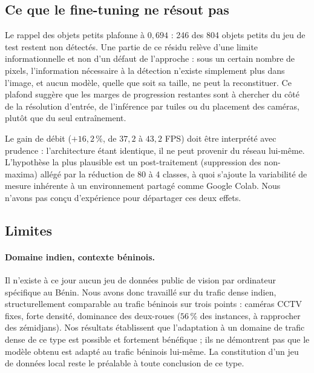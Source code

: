 \subsection{Ce que le fine-tuning ne résout pas}

Le rappel des objets petits plafonne à $0{,}694$ : 246 des 804 objets
petits du jeu de test restent non détectés. Une partie de ce résidu
relève d'une limite informationnelle et non d'un défaut de l'approche :
sous un certain nombre de pixels, l'information nécessaire à la détection
n'existe simplement plus dans l'image, et aucun modèle, quelle que soit
sa taille, ne peut la reconstituer. Ce plafond suggère que les marges de
progression restantes sont à chercher du côté de la résolution d'entrée,
de l'inférence par tuiles ou du placement des caméras, plutôt que du seul
entraînement.

Le gain de débit ($+16{,}2\,\%$, de $37{,}2$ à $43{,}2$ FPS) doit être
interprété avec prudence : l'architecture étant identique, il ne peut
provenir du réseau lui-même. L'hypothèse la plus plausible est un
post-traitement (suppression des non-maxima) allégé par la réduction de
80 à 4 classes, à quoi s'ajoute la variabilité de mesure inhérente à un
environnement partagé comme Google Colab. Nous n'avons pas conçu
d'expérience pour départager ces deux effets.

\subsection{Limites}

\paragraph{Domaine indien, contexte béninois.}
Il n'existe à ce jour aucun jeu de données public de vision par
ordinateur spécifique au Bénin. Nous avons donc travaillé sur du trafic
dense indien, structurellement comparable au trafic béninois sur trois
points : caméras CCTV fixes, forte densité, dominance des deux-roues
($56\,\%$ des instances, à rapprocher des zémidjans). Nos résultats
établissent que l'adaptation à un domaine de trafic dense de ce type est
possible et fortement bénéfique ; ils ne démontrent pas que le modèle
obtenu est adapté au trafic béninois lui-même. La constitution d'un jeu
de données local reste le préalable à toute conclusion de ce type.

